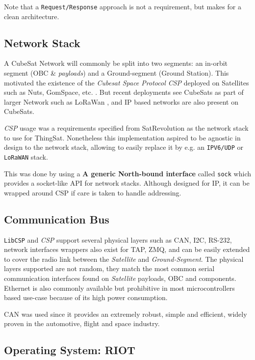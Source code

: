 Note that a \texttt{Request/Response} approach is not a requirement, but makes
for a clean architecture.

\subsection{Network Stack}

A CubeSat Network will commonly be split into two segments: an in-orbit segment
(OBC \& \textit{payloads}) and a Ground-segment (Ground Station). This motivated
the existence of the \textit{Cubesat Space Protocol CSP} deployed on Satellites
such as Nuts, GomSpace, etc. . But recent deployments see CubeSats
as part of larger Network such as LoRaWan , and IP based
networks are also present on CubeSats.

\textit{CSP} usage was a requirements specified from SatRevolution as the network
stack to use for ThingSat. Nonetheless this implementation aspired to be agnostic
in design to the network stack, allowing to easily replace it by e.g. an
\texttt{IPV6/UDP} or \texttt{LoRaWAN} stack.

This was done by using a {\bf A generic North-bound interface} called \texttt{sock}
which provides a socket-like API for network stacks. Although designed for IP,
it can be wrapped around CSP if care is taken to handle addressing.

\subsection{Communication Bus}

\texttt{LibCSP} and \textit{CSP} support several physical layers such as CAN, I2C,
RS-232, network interfaces wrappers also exist for TAP, ZMQ, and can be easily
extended to cover the radio link between the \textit{Satellite} and
\textit{Ground-Segment}. The physical layers supported are not random, they match
the most common serial communication interfaces found on \textit{Satellite}
payloads, OBC and components. Ethernet is also commonly available  but prohibitive
in most microcontrollers based use-case because of its high power consumption.

CAN was used since it provides an extremely robust, simple and efficient,
widely proven in the automotive, flight and space industry.

\subsection{Operating System: RIOT}

